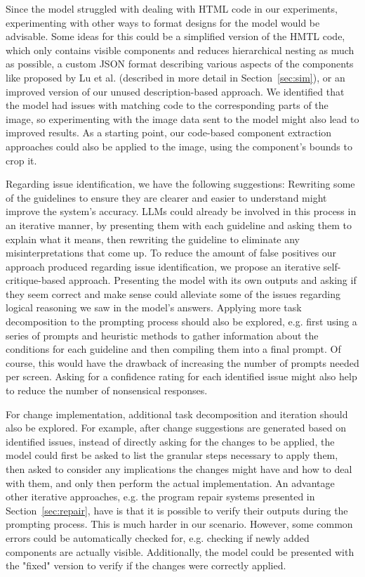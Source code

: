 \documentclass[11pt,titlepage,oneside,openany]{book}
\begin{document}
Since the model struggled with dealing with HTML code in our experiments, experimenting with other ways to format designs for the model would be advisable. Some ideas for this could be a simplified version of the HMTL code, which only contains visible components and reduces hierarchical nesting as much as possible, a custom JSON format describing various aspects of the components like proposed by Lu et al. \cite{lu_ai_2024} (described in more detail in Section~\ref{sec:sim}), or an improved version of our unused description-based approach. We identified that the model had issues with matching code to the corresponding parts of the image, so experimenting with the image data sent to the model might also lead to improved results. As a starting point, our code-based component extraction approaches could also be applied to the image, using the component's bounds to crop it.

Regarding issue identification, we have the following suggestions: Rewriting some of the guidelines to ensure they are clearer and easier to understand might improve the system's accuracy. LLMs could already be involved in this process in an iterative manner, by presenting them with each guideline and asking them to explain what it means, then rewriting the guideline to eliminate any misinterpretations that come up. To reduce the amount of false positives our approach produced regarding issue identification, we propose an iterative self-critique-based approach. Presenting the model with its own outputs and asking if they seem correct and make sense could alleviate some of the issues regarding logical reasoning we saw in the model's answers. Applying more task decomposition to the prompting process should also be explored, e.g. first using a series of prompts and heuristic methods to gather information about the conditions for each guideline and then compiling them into a final prompt. Of course, this would have the drawback of increasing the number of prompts needed per screen. Asking for a confidence rating for each identified issue might also help to reduce the number of nonsensical responses. 

For change implementation, additional task decomposition and iteration should also be explored. For example, after change suggestions are generated based on identified issues, instead of directly asking for the changes to be applied, the model could first be asked to list the granular steps necessary to apply them, then asked to consider any implications the changes might have and how to deal with them, and only then perform the actual implementation. An advantage other iterative approaches, e.g. the program repair systems presented in Section~\ref{sec:repair}, have is that it is possible to verify their outputs during the prompting process. This is much harder in our scenario. However, some common errors could be automatically checked for, e.g. checking if newly added components are actually visible. Additionally, the model could be presented with the "fixed" version to verify if the changes were correctly applied.
\end{document}
